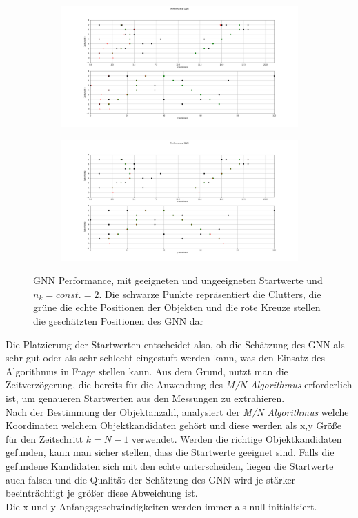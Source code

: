 \documentclass[10pt,a4paper]{article}
\begin{document}
\begin{figure}[h!]\label{pic:GNNSW}
    \centering
    \begin{subfigure}{0.6\textwidth}
        \includegraphics[width=11cm]{./Pictures_report/GNNTestdatenSW0.png}
    \end{subfigure}

\medskip
    \begin{subfigure}{0.6\textwidth}
        \includegraphics[width= 11cm]{./Pictures_report/GNNTestdatenSW1.png}
    \end{subfigure}
    \caption[]{GNN Performance, mit geeigneten und ungeeigneten Startwerte und $n_k = const. = 2$. Die schwarze Punkte repräsentiert die Clutters, die grüne die echte Positionen der Objekten und die rote Kreuze stellen die geschätzten Positionen des GNN dar  }
    \label{pic:GNNSW}
\end{figure}


Die Platzierung der Startwerten entscheidet also, ob die Schätzung des GNN als sehr gut  oder als sehr schlecht eingestuft werden kann, was den Einsatz des Algorithmus in Frage stellen kann. Aus dem Grund, nutzt man die Zeitverzögerung, die bereits für die Anwendung des \textit{M/N Algorithmus} erforderlich ist, um genaueren Startwerten aus den Messungen zu extrahieren.\\
Nach der Bestimmung der Objektanzahl, analysiert der \textit{M/N Algorithmus} welche Koordinaten welchem Objektkandidaten gehört und diese werden als x,y Größe für den Zeitschritt $k = N-1$ verwendet. Werden die richtige  Objektkandidaten gefunden, kann man sicher stellen, dass die Startwerte geeignet sind. Falls die gefundene Kandidaten sich mit den echte unterscheiden, liegen die Startwerte auch falsch und die Qualität der Schätzung des GNN wird je stärker beeinträchtigt je größer diese Abweichung ist.\\
Die x und y Anfangsgeschwindigkeiten werden immer als null initialisiert.
\end{document}

